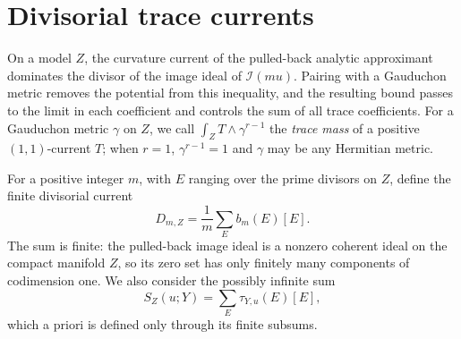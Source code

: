 \section{Divisorial trace currents}\label{sec:divisorial-model-bound}

On a model $Z$, the curvature current of the pulled-back analytic approximant dominates the divisor of the image ideal of $\mathcal I(mu)$. Pairing with a Gauduchon metric removes the potential from this inequality, and the resulting bound passes to the limit in each coefficient and controls the sum of all trace coefficients. For a Gauduchon metric $\gamma$ on $Z$, we call $\int_ZT\wedge\gamma^{r-1}$ the \emph{trace mass} of a positive $(1,1)$-current $T$; when $r=1$, $\gamma^{r-1}=1$ and $\gamma$ may be any Hermitian metric.

For a positive integer $m$, with $E$ ranging over the prime divisors on $Z$, define the finite divisorial current
\[
 D_{m,Z}=\frac1m\sum_E b_m(E)[E].
\]
The sum is finite: the pulled-back image ideal is a nonzero coherent ideal on the compact manifold $Z$, so its zero set has only finitely many components of codimension one. We also consider the possibly infinite sum
\[
 S_Z(u;Y)=\sum_E\tau_{Y,u}(E)[E],
\]
which a priori is defined only through its finite subsums.

